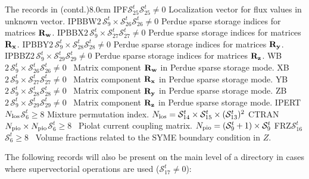 \begin{DescriptionEnregistrement}{The  records in
 (contd.)}{8.0cm}
\OptIntEnr
  {IPF}{$\mathcal{S}^{t}_{25}$}{$\mathcal{S}^{t}_{25}\ne 0$}
  {Localization vector for flux values in unknown vector.} 
\OptIntEnr
  {IPBBW}{$2 \, \mathcal{S}^{t}_{9} \times \mathcal{S}^{t}_{26}$}{$\mathcal{S}^{t}_{26}\ne 0$}
  {Perdue sparse storage indices for matrices $\bf{R}_w$.} 
\OptIntEnr
  {IPBBX}{$2 \, \mathcal{S}^{t}_{9} \times \mathcal{S}^{t}_{27}$}{$\mathcal{S}^{t}_{27}\ne 0$}
  {Perdue sparse storage indices for matrices $\bf{R}_x$.}
\OptIntEnr
  {IPBBY}{$2 \, \mathcal{S}^{t}_{9} \times \mathcal{S}^{t}_{28}$}{$\mathcal{S}^{t}_{28}\ne 0$}
  {Perdue sparse storage indices for matrices $\bf{R}_y$.}
\OptIntEnr
  {IPBBZ}{$2 \, \mathcal{S}^{t}_{9} \times \mathcal{S}^{t}_{29}$}{$\mathcal{S}^{t}_{29}\ne 0$}
  {Perdue sparse storage indices for matrices $\bf{R}_z$.} 
\OptRealEnr
  {WB}{$2 \, \mathcal{S}^{t}_{9} \times \mathcal{S}^{t}_{26}$}{$\mathcal{S}^{t}_{26}\ne 0$}{~}
  {Matrix component $\bf{R}_w$ in Perdue sparse storage mode.} 
\OptRealEnr
  {XB}{$2 \, \mathcal{S}^{t}_{9} \times \mathcal{S}^{t}_{27}$}{$\mathcal{S}^{t}_{27}\ne 0$}{~}
  {Matrix component $\bf{R}_x$ in Perdue sparse storage mode.} 
\OptRealEnr
  {YB}{$2 \, \mathcal{S}^{t}_{9} \times \mathcal{S}^{t}_{28}$}{$\mathcal{S}^{t}_{28}\ne 0$}{~}
  {Matrix component $\bf{R}_y$ in Perdue sparse storage mode.} 
\OptRealEnr
  {ZB}{$2 \, \mathcal{S}^{t}_{9} \times \mathcal{S}^{t}_{29}$}{$\mathcal{S}^{t}_{29}\ne 0$}{~}
  {Matrix component $\bf{R}_z$ in Perdue sparse storage mode.} 
\OptIntEnr
  {IPERT}{$N_{\rm los}$}{$\mathcal{S}^{t}_{6}\ge 8$}
  {Mixture permutation index. $N_{\rm los}=\mathcal{S}^{t}_{14}\times \mathcal{S}^{t}_{15}\times (\mathcal{S}^{t}_{13})^2$} 
\OptDbleEnr
  {CTRAN}{$N_{\rm pio}\times N_{\rm pio}$}{$\mathcal{S}^{t}_{6}\ge 8$}{~}
  {Piolat current coupling matrix. $N_{\rm pio}=(\mathcal{S}^{t}_{9}+1)\times \mathcal{S}^{t}_{9}$} 
\OptRealEnr
  {FRZ}{$\mathcal{S}^{t}_{16}$}{$\mathcal{S}^{t}_{6}\ge 8$}{~}
  {Volume fractions related to the SYME boundary condition in $Z$.} 
\end{DescriptionEnregistrement}

The following records will also be present on the main level of a 
directory in cases where supervectorial operations are used ($\mathcal{S}^{t}_{17}\ne 0$):

